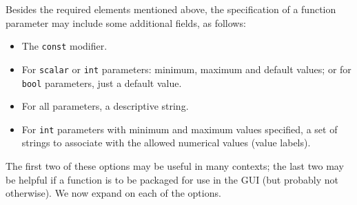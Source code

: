 Besides the required elements mentioned above, the specification of a
function parameter may include some additional fields, as follows:
\begin{itemize}
\item The \texttt{const} modifier.
\item For \texttt{scalar} or \texttt{int} parameters: minimum, maximum
  and default values; or for \texttt{bool} parameters, just a default
  value.
\item For all parameters, a descriptive string.
\item For \texttt{int} parameters with minimum and maximum values
  specified, a set of strings to associate with the allowed numerical
  values (value labels).
\end{itemize}

The first two of these options may be useful in many contexts; the
last two may be helpful if a function is to be packaged for use in
the  GUI (but probably not otherwise). We now expand on
each of the options.

